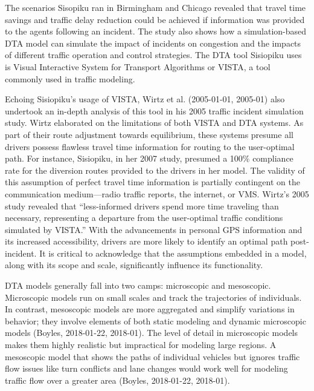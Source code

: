\documentclass[fancy, oneside, mastersfancy, ms]{byuthesis}
\begin{document}
The scenarios Sisopiku ran in Birmingham and Chicago revealed that
travel time savings and traffic delay reduction could be achieved if
information was provided to the agents following an incident. The study
also shows how a simulation-based DTA model can simulate the impact of
incidents on congestion and the impacts of different traffic operation
and control strategies. The DTA tool Sisiopiku uses is Visual
Interactive System for Transport Algorithms or VISTA, a tool commonly
used in traffic modeling.

Echoing Sisiopiku's usage of VISTA, Wirtz et al. (2005-01-01, 2005-01)
also undertook an in-depth analysis of this tool in his 2005 traffic
incident simulation study. Wirtz elaborated on the limitations of both
VISTA and DTA systems. As part of their route adjustment towards
equilibrium, these systems presume all drivers possess flawless travel
time information for routing to the user-optimal path. For instance,
Sisiopiku, in her 2007 study, presumed a 100\% compliance rate for the
diversion routes provided to the drivers in her model. The validity of
this assumption of perfect travel time information is partially
contingent on the communication medium---radio traffic reports, the
internet, or VMS. Wirtz's 2005 study revealed that ``less-informed
drivers spend more time traveling than necessary, representing a
departure from the user-optimal traffic conditions simulated by VISTA.''
With the advancements in personal GPS information and its increased
accessibility, drivers are more likely to identify an optimal path
post-incident. It is critical to acknowledge that the assumptions
embedded in a model, along with its scope and scale, significantly
influence its functionality.

DTA models generally fall into two camps: microscopic and mesoscopic.
Microscopic models run on small scales and track the trajectories of
individuals. In contrast, mesoscopic models are more aggregated and
simplify variations in behavior; they involve elements of both static
modeling and dynamic microscopic models (Boyles, 2018-01-22, 2018-01).
The level of detail in microscopic models makes them highly realistic
but impractical for modeling large regions. A mesoscopic model that
shows the paths of individual vehicles but ignores traffic flow issues
like turn conflicts and lane changes would work well for modeling
traffic flow over a greater area (Boyles, 2018-01-22, 2018-01).
\end{document}
